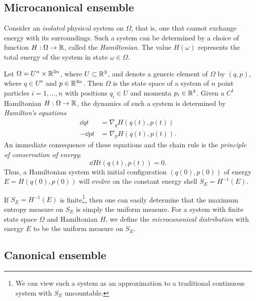 
\subsection{Microcanonical ensemble}

Consider an \emph{isolated} physical system on $\Omega$, that is, one that cannot
exchange energy with its surroundings. Such a system can be determined by a choice
of function $H : \Omega \rightarrow {\mathbb R}$, called the \emph{Hamiltonian}. The value $H(\omega)$
represents the total energy of the system in state
$\omega\in\Omega$.

\begin{example}
Let $\Omega = U^n \times {\mathbb R}^{3n}$, where $U \subset {\mathbb R}^3$, and denote a generic
element of $\Omega$ by $(q, p)$, where $q \in U^n$ and $p \in {\mathbb R}^{3n}$. Then
$\Omega$ is the state space of a system of $n$ point particles
$i = 1, \ldots, n$ with positions $q_i \in U$ and momenta $p_i \in {\mathbb R}^3$. Given
a $C^1$ Hamiltonian $H : \Omega \rightarrow {\mathbb R}$, the dynamics of such a system is determined
by \emph{Hamilton's equations}
\begin{align}
\dd{q}{t}   &= \nabla_q H(q(t), p(t)) \\
-\dd{p}{t}  &= \nabla_p H(q(t), p(t)).
\end{align}
An immediate consequence of these equations and the chain rule is the \emph{principle of conservation of energy}:
\begin{equation}
\dd{H}{t}(q(t), p(t)) = 0.
\end{equation}
Thus, a Hamiltonian system with initial configuration $(q(0), p(0))$ of energy
$E = H(q(0), p(0))$ will evolve on the constant energy shell $S_E = H^{-1}(E)$.
\end{example}

If $S_E = H^{-1}(E)$ is finite\footnote{We can view such a system as an approximation to a traditional continuous system with $S_E$ uncountable.}, then one can easily determine that the maximum entropy measure on $S_E$ is simply the uniform measure. For a system with finite state space $\Omega$ and Hamiltonian $H$, we define the \emph{microcanonical distribution} with energy $E$ to be the uniform measure on $S_E$.


\subsection{Canonical ensemble}


